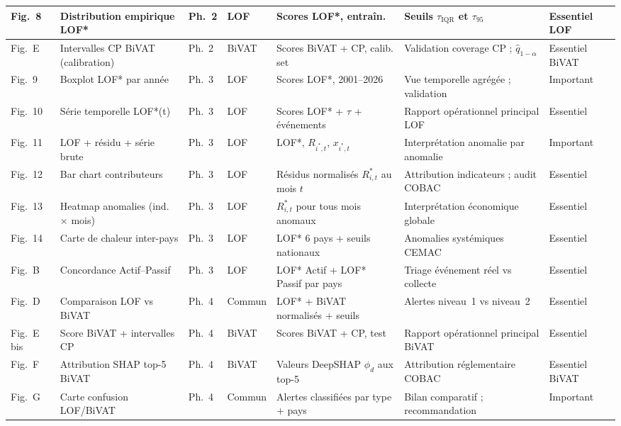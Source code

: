 \documentclass[12pt,a4paper]{article}
\begin{document}
\begin{landscape}
\begin{longtable}{p{1.5cm}p{3.8cm}p{2cm}p{1.5cm}p{3cm}p{3.5cm}p{2cm}}
Fig.~8 & Distribution empirique LOF* &
Ph.~2 & LOF &
Scores LOF*, entraîn. &
Seuils $\tau_{\mathrm{IQR}}$ et $\tau_{95}$ &
Essentiel LOF \\
\midrule

Fig.~E & Intervalles CP BiVAT (calibration) &
Ph.~2 & BiVAT &
Scores BiVAT + CP, calib. set &
Validation coverage CP ; $\hat{q}_{1-\alpha}$ &
Essentiel BiVAT \\
\midrule

Fig.~9 & Boxplot LOF* par année &
Ph.~3 & LOF &
Scores LOF*, 2001--2026 &
Vue temporelle agrégée ; validation &
Important \\
\midrule

Fig.~10 & Série temporelle LOF*(t) &
Ph.~3 & LOF &
Scores LOF* + $\tau$ + événements &
Rapport opérationnel principal LOF &
Essentiel \\
\midrule

Fig.~11 & LOF + résidu + série brute &
Ph.~3 & LOF &
LOF*, $R_{i^*,t}$, $x_{i^*,t}$ &
Interprétation anomalie par anomalie &
Important \\
\midrule

Fig.~12 & Bar chart contributeurs &
Ph.~3 & LOF &
Résidus normalisés $R_{i,t}^*$ au mois $t$ &
Attribution indicateurs ; audit COBAC &
Essentiel \\
\midrule

Fig.~13 & Heatmap anomalies (ind. × mois) &
Ph.~3 & LOF &
$R_{i,t}^*$ pour tous mois anomaux &
Interprétation économique globale &
Essentiel \\
\midrule

Fig.~14 & Carte de chaleur inter-pays &
Ph.~3 & LOF &
LOF* 6 pays + seuils nationaux &
Anomalies systémiques CEMAC &
Essentiel \\
\midrule

Fig.~B & Concordance Actif--Passif &
Ph.~3 & LOF &
LOF* Actif + LOF* Passif par pays &
Triage événement réel vs collecte &
Essentiel \\
\midrule

Fig.~D & Comparaison LOF vs BiVAT &
Ph.~4 & Commun &
LOF* + BiVAT normalisés + seuils &
Alertes niveau~1 vs niveau~2 &
Essentiel \\
\midrule

Fig.~E bis & Score BiVAT + intervalles CP &
Ph.~4 & BiVAT &
Scores BiVAT + CP, test &
Rapport opérationnel principal BiVAT &
Essentiel \\
\midrule

Fig.~F & Attribution SHAP top-5 BiVAT &
Ph.~4 & BiVAT &
Valeurs DeepSHAP $\phi_d$ aux top-5 &
Attribution réglementaire COBAC &
Essentiel BiVAT \\
\midrule

Fig.~G & Carte confusion LOF/BiVAT &
Ph.~4 & Commun &
Alertes classifiées par type + pays &
Bilan comparatif ; recommandation &
Important \\
\end{longtable}
\end{landscape}
\end{document}

